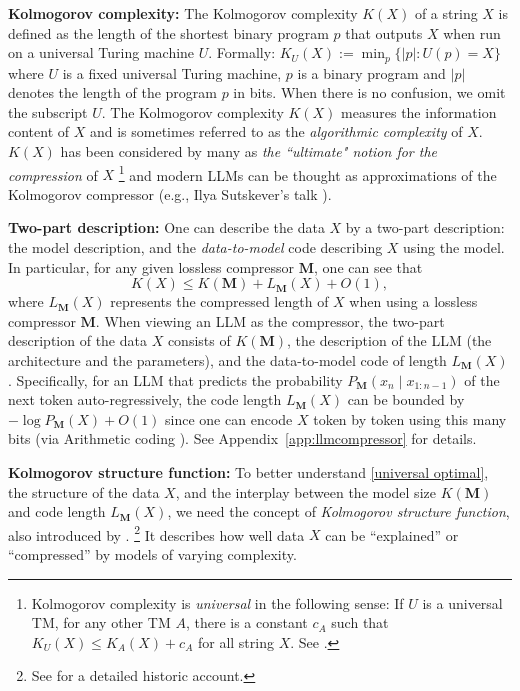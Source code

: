\documentclass[11pt]{article}
\theoremstyle{plain}
\theoremstyle{definition}
\newcommand{\codelength}{L}
\newcommand{\llm}{\boldsymbol{M}}
\begin{document}
\noindent
{\bf Kolmogorov complexity:}
The Kolmogorov complexity $K(X)$ of a string $X$ is defined as the length of the shortest binary program $p$ that outputs $X$ when run on a universal Turing machine $U$. Formally:
$
K_U(X) := \min\nolimits_{p} \{|p| : U(p) = X\}
$
where $U$ is a fixed universal Turing machine, $p$ is a binary program and $|p|$ denotes the length of the program $p$ in bits.
When there is no confusion, we omit the subscript $U$.
The Kolmogorov complexity $K(X)$ measures the information content of $X$ and is sometimes referred to as the {\em algorithmic complexity} of $X$.
$K(X)$ has been considered by many as {\em the ``ultimate" notion for the compression } 
of $X$
\footnote{
Kolmogorov complexity is {\em universal} in the following sense:
If $U$ is a universal TM, for any other TM $A$, there is a 
constant $c_A$ such that $K_U(X)\leq K_A(X)+c_A$ for all string $X$.
See \cite{li2008introduction}.
}
and modern LLMs can be thought as approximations of the Kolmogorov compressor (e.g., Ilya Sutskever's talk \citep{Ilyatalk2023}).

\noindent
{\bf Two-part description:}
One can describe the data $X$ by a two-part description:
the model description, and the {\em data-to-model} code describing
$X$ using the model. In particular, 
for any given lossless compressor $\llm$, one can see that
\begin{equation}
    K(X)\le K(\llm)+\codelength_{\llm}(X)+O(1), \label{universal optimal}
\end{equation}
where $\codelength_{\llm}(X)$ represents the compressed length of $X$ when using a lossless compressor $\llm$.  
When viewing an LLM as the compressor, 
the two-part description of the data $X$
consists of $K(\llm)$, the description of the LLM (the architecture and the parameters), and the data-to-model code of length
$\codelength_{\llm}(X)$.
Specifically, for an LLM that predicts the probability
$P_{\llm}(x_n\mid x_{1:n-1})$ of the
next token auto-regressively, 
the code length $\codelength_{\llm}(X)$ can be 
bounded by $-\log P_{\llm}(X)+O(1)$ since  
one can encode $X$ token by token using this many bits (via Arithmetic coding \citep{rissanen1976generalized,deletanglanguage}).
See Appendix~\ref{app:llmcompressor} for  details.
 


\noindent
{\bf Kolmogorov structure function:}
To better understand \eqref{universal optimal},
the structure of the data $X$,
and the interplay between the model size $K(\llm)$ and code length 
$\codelength_{\llm}(X)$,
we need the concept of {\em Kolmogorov structure function}, also introduced by \cite{Kolmogorov1974}.
\footnote{
See \cite{vereshchagin2004kolmogorov} for a detailed historic account.
}
It describes how well data $X$ can be “explained” or “compressed” by models of varying complexity.
\end{document}
